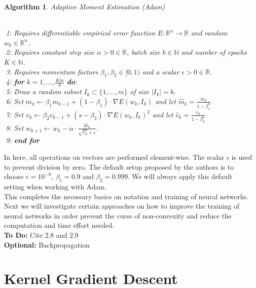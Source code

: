 \documentclass[11pt, a4paper]{article}
\newtheorem{algorithm}[theorem]{Algorithm}
\newcommand{\N}{\mathds{N}}
\newcommand{\R}{\mathds{R}}
\begin{document}
\begin{algorithm}
\caption{Adaptive Moment Estimation (Adam)} \ \\
\textcolor{white}{$\Big |$}1: Requires differentiable empirical error function $E: \R^n \to \R$ and random $w_0 \in \R^n$.  \\
\textcolor{white}{$\Big |$}2: Requires constant step size $\alpha > 0 \in \R$, batch size $b \in \N$ and number of epochs $K \in \N$. \\
\textcolor{white}{$\Big |$}3: Requires momentum factors $\beta_1, \beta_2 \in [0,1)$ and a scalar $\epsilon > 0 \in \R$. \\
\textcolor{white}{$\Big |$}4: \textbf{for} $k=1, \dots, \frac{Km}{b}$ \textbf{do}: \\
\textcolor{white}{$\Big |$}5: \quad Draw a random subset $I_k \subset \{1, \dots, m \}$ of size $| I_k | = b$. \\
\textcolor{white}{$\Big |$}6: \quad Set $m_{k} \leftarrow \beta_1 m_{k-1} + (1-\beta_1) \cdot \nabla E(w_k,I_k)$ and let $\hat{m}_k = \frac{m_k}{1-\beta_1^k}$. \\
\textcolor{white}{$\Big |$}7: \quad Set $v_{k} \leftarrow \beta_2 v_{k-1} + (s-\beta_2) \cdot \nabla E(w_k,I_k)^2$ and let $\hat{v}_k = \frac{v_k}{1-\beta_2^k}$. \\
\textcolor{white}{$\Big |$}8: \quad Set $w_{k+1} \leftarrow w_k - \alpha \cdot \frac{\hat{m}_k}{\sqrt{\hat{v}_k} + \epsilon}$. \\
\textcolor{white}{$\Big |$}9: \textbf{end for}
\end{algorithm}

In here, all operations on vectors are performed element-wise. The scalar $\epsilon$ is used to prevent division by zero. The default setup proposed by the authors is to choose $\epsilon = 10^{-8}$, $\beta_1 = 0.9$ and $\beta_2 = 0.999$. We will always apply this default setting when working with Adam. \\

This completes the necessary basics on notation and training of neural networks. Next we will investigate certain approaches on how to improve the training of neural networks in order prevent the curse of non-convexity and reduce the computation and time effort needed.  \\

\textbf{To Do:} Cite 2.8 and 2.9 \\
\textbf{Optional:} Backpropagation

\pagebreak
\section{Kernel Gradient Descent} \label{sec:kernel}
\end{document}
